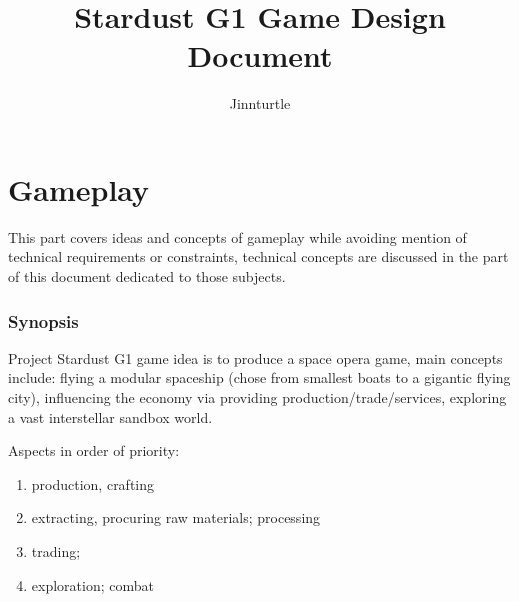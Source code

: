 \documentclass[a4paper,10pt]{article}
\begin{document}
\newlength{\tabcolsepDefault}
\setlength{\tabcolsepDefault}{\tabcolsep}




\newcommand{\textbi}[1]{\textbf{\textit{#1}}}

\newcommand{\projName}{Stardust G1}


\title{Stardust G1 Game Design Document}
\author{Jinnturtle}

\maketitle
\tableofcontents



\part{Gameplay}

This part covers ideas and concepts of gameplay while avoiding mention of
technical requirements or constraints, technical concepts are discussed in
the part of this document dedicated to those subjects.

\section{Synopsis}
\begin{multicols}{2}
Project \projName{} game idea is to produce a space opera game, main concepts
include: flying a modular spaceship (chose from smallest boats to a gigantic
flying city), influencing the economy via providing production/trade/services,
exploring a vast interstellar sandbox world.

Aspects in order of priority:
\begin{enumerate}
    \item production, crafting
    \item extracting, procuring raw materials; processing
    \item trading;
    \item exploration; combat
\end{enumerate}

\end{multicols}
\end{document}

